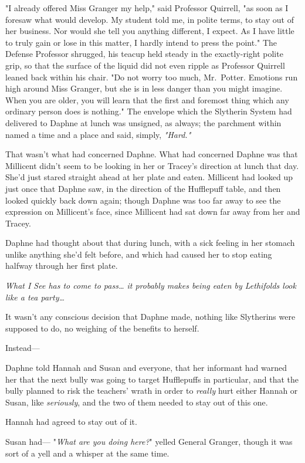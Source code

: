 "I already offered Miss Granger my help," said Professor Quirrell, "as soon as 
I foresaw what would develop. My student told me, in polite terms, to stay out 
of her business. Nor would she tell you anything different, I expect. As I have 
little to truly gain or lose in this matter, I hardly intend to press the 
point." The Defense Professor shrugged, his teacup held steady in the 
exactly-right polite grip, so that the surface of the liquid did not even 
ripple as Professor Quirrell leaned back within his chair. "Do not worry too 
much, Mr.~Potter. Emotions run high around Miss Granger, but she is in less 
danger than you might imagine. When you are older, you will learn that the 
first and foremost thing which any ordinary person does is nothing."
\sbreak
The envelope which the Slytherin System had delivered to Daphne at lunch was 
unsigned, as always; the parchment within named a time and a place and said, 
simply, \emph{"Hard."}

That wasn't what had concerned Daphne. What had concerned Daphne was that 
Millicent didn't seem to be looking in her or Tracey's direction at lunch that 
day. She'd just stared straight ahead at her plate and eaten. Millicent had 
looked up just once that Daphne saw, in the direction of the Hufflepuff table, 
and then looked quickly back down again; though Daphne was too far away to see 
the expression on Millicent's face, since Millicent had sat down far away from 
her and Tracey.

Daphne had thought about that during lunch, with a sick feeling in her stomach 
unlike anything she'd felt before, and which had caused her to stop eating 
halfway through her first plate.

\emph{What I See has to come to pass{\ldots} it probably makes being eaten by 
Lethifolds look like a tea party{\ldots}}

It wasn't any conscious decision that Daphne made, nothing like Slytherins were 
supposed to do, no weighing of the benefits to herself.

Instead---

Daphne told Hannah and Susan and everyone, that her informant had warned her 
that the next bully was going to target Hufflepuffs in particular, and that the 
bully planned to risk the teachers' wrath in order to \emph{really} hurt either 
Hannah or Susan, like \emph{seriously}, and the two of them needed to stay out 
of this one.

Hannah had agreed to stay out of it.

Susan had---
\sbreak
"\emph{What are you doing here?}" yelled General Granger, though it was sort of 
a yell and a whisper at the same time.

